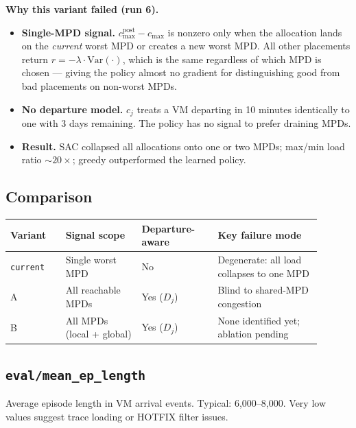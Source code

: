 \documentclass[11pt]{article}
\begin{document}
\medskip
\noindent\textbf{Why this variant failed (run 6).}
\begin{itemize}
  \item \textbf{Single-MPD signal.}
        $c_{\max}^{\text{post}} - c_{\max}$ is nonzero only when the
        allocation lands on the \emph{current} worst MPD or creates a new
        worst MPD.  All other placements return $r = -\lambda \cdot \mathrm{Var}(\cdot)$,
        which is the same regardless of which MPD is chosen ---
        giving the policy almost no gradient for distinguishing good from bad placements
        on non-worst MPDs.
  \item \textbf{No departure model.}
        $c_j$ treats a VM departing in 10 minutes identically to one with
        3 days remaining.  The policy has no signal to prefer draining MPDs.
  \item \textbf{Result.}
        SAC collapsed all allocations onto one or two MPDs;
        max/min load ratio $\sim 20\times$; greedy outperformed the learned policy.
\end{itemize}

\subsection*{Comparison}

\begin{center}
\small
\renewcommand{\arraystretch}{1.3}
\begin{tabular}{p{0.16\linewidth}p{0.22\linewidth}p{0.22\linewidth}p{0.30\linewidth}}
\toprule
\textbf{Variant} & \textbf{Signal scope} & \textbf{Departure-aware} & \textbf{Key failure mode} \\
\midrule
\texttt{current} & Single worst MPD & No & Degenerate: all load collapses to one MPD \\
A                & All reachable MPDs & Yes ($D_j$) & Blind to shared-MPD congestion \\
B                & All MPDs (local + global) & Yes ($D_j$) & None identified yet; ablation pending \\
\bottomrule
\end{tabular}
\end{center}

\subsection*{\texttt{eval/mean\_ep\_length}}
Average episode length in VM arrival events.  Typical: 6{,}000--8{,}000.
Very low values suggest trace loading or HOTFIX filter issues.
\end{document}

